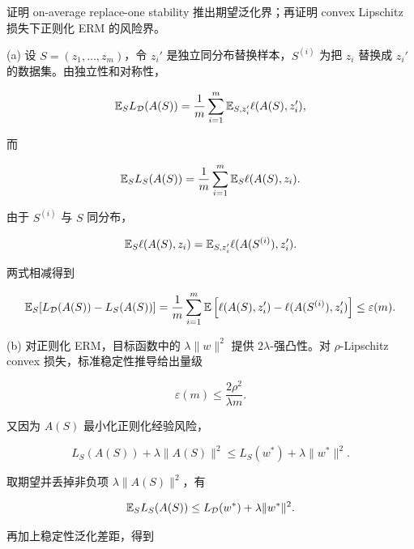 \begin{examproblem}
证明 on-average replace-one stability 推出期望泛化界；再证明 convex Lipschitz 损失下正则化 ERM 的风险界。
\end{examproblem}

\solution
(a) 设 \(S=(z_1,\ldots,z_m)\)，令 \(z_i'\) 是独立同分布替换样本，\(S^{(i)}\) 为把 \(z_i\) 替换成 \(z_i'\) 的数据集。由独立性和对称性，

\[
  \mathbb{E}_S L_{\mathcal{D}}(A(S))
  =
  \frac1m\sum_{i=1}^{m}
  \mathbb{E}_{S,z_i'} \ell(A(S),z_i'),
\]

而

\[
  \mathbb{E}_S L_S(A(S))
  =
  \frac1m\sum_{i=1}^{m}
  \mathbb{E}_S \ell(A(S),z_i).
\]

由于 \(S^{(i)}\) 与 \(S\) 同分布，

\[
  \mathbb{E}_S \ell(A(S),z_i)
  =
  \mathbb{E}_{S,z_i'} \ell(A(S^{(i)}),z_i').
\]

两式相减得到

\[
  \mathbb{E}_S\!\left[
    L_{\mathcal{D}}(A(S))-L_S(A(S))
  \right]
  =
  \frac1m\sum_{i=1}^{m}
  \mathbb{E}
  \left[
    \ell(A(S),z_i')-\ell(A(S^{(i)}),z_i')
  \right]
  \le \varepsilon(m).
\]

(b) 对正则化 ERM，目标函数中的 \(\lambda\|w\|^2\) 提供 \(2\lambda\)-强凸性。对 \(\rho\)-Lipschitz convex 损失，标准稳定性推导给出量级

\[
  \varepsilon(m)\le \frac{2\rho^2}{\lambda m}.
\]

又因为 \(A(S)\) 最小化正则化经验风险，

\[
  L_S(A(S))+\lambda\|A(S)\|^2
  \le
  L_S(w^*)+\lambda\|w^*\|^2.
\]

取期望并丢掉非负项 \(\lambda\|A(S)\|^2\)，有

\[
  \mathbb{E}_S L_S(A(S))
  \le
  L_{\mathcal{D}}(w^*)+\lambda\|w^*\|^2.
\]

再加上稳定性泛化差距，得到

